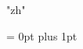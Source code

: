 \usepackage{fontspec}
\usepackage{xeCJK}
\usepackage{multicol}
\usepackage{bm}


\setmainfont{Calibri}


\XeTeXlinebreaklocale "zh"

\XeTeXlinebreakskip = 0pt plus 1pt

\setlength{\parskip}{0.15cm}

\linespread{1.2}\selectfont
